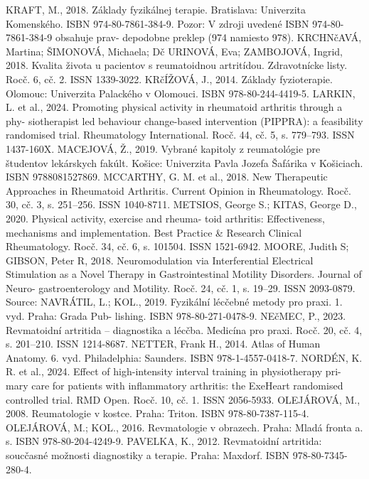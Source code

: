 KRAFT, M., 2018. Základy fyzikálnej terapie. Bratislava: Univerzita Komenského. ISBN
974-80-7861-384-9. Pozor: V zdroji uvedené ISBN 974-80-7861-384-9 obsahuje prav-
depodobne preklep (974 namiesto 978).
KRCHNčAVÁ, Martina; ŠIMONOVÁ, Michaela; Dč URINOVÁ, Eva; ZAMBOJOVÁ, Ingrid,
2018. Kvalita života u pacientov s reumatoidnou artritídou. Zdravotnícke listy. Rocč. 6, cč.
2. ISSN 1339-3022.
KRčÍŽOVÁ, J., 2014. Základy fyzioterapie. Olomouc: Univerzita Palackého v Olomouci.
ISBN 978-80-244-4419-5.
LARKIN, L. et al., 2024. Promoting physical activity in rheumatoid arthritis through a phy-
siotherapist led behaviour change-based intervention (PIPPRA): a feasibility randomised
trial. Rheumatology International. Rocč. 44, cč. 5, s. 779–793. ISSN 1437-160X.
MACEJOVÁ, Ž., 2019. Vybrané kapitoly z reumatológie pre študentov lekárskych fakúlt.
Košice: Univerzita Pavla Jozefa Šafárika v Košiciach. ISBN 9788081527869.
MCCARTHY, G. M. et al., 2018. New Therapeutic Approaches in Rheumatoid Arthritis.
Current Opinion in Rheumatology. Rocč. 30, cč. 3, s. 251–256. ISSN 1040-8711.
METSIOS, George S.; KITAS, George D., 2020. Physical activity, exercise and rheuma-
toid arthritis: Effectiveness, mechanisms and implementation. Best Practice & Research
Clinical Rheumatology. Rocč. 34, cč. 6, s. 101504. ISSN 1521-6942.
MOORE, Judith S; GIBSON, Peter R, 2018. Neuromodulation via Interferential Electrical
Stimulation as a Novel Therapy in Gastrointestinal Motility Disorders. Journal of Neuro-
gastroenterology and Motility. Rocč. 24, cč. 1, s. 19–29. ISSN 2093-0879. Source:
NAVRÁTIL, L.; KOL., 2019. Fyzikální lécčebné metody pro praxi. 1. vyd. Praha: Grada Pub-
lishing. ISBN 978-80-271-0478-9.
NEčMEC, P., 2023. Revmatoidní artritida – diagnostika a lécčba. Medicína pro praxi. Rocč. 20,
cč. 4, s. 201–210. ISSN 1214-8687.
NETTER, Frank H., 2014. Atlas of Human Anatomy. 6. vyd. Philadelphia: Saunders. ISBN
978-1-4557-0418-7.
NORDÉN, K. R. et al., 2024. Effect of high-intensity interval training in physiotherapy pri-
mary care for patients with inflammatory arthritis: the ExeHeart randomised controlled
trial. RMD Open. Rocč. 10, cč. 1. ISSN 2056-5933.
OLEJÁROVÁ, M., 2008. Reumatologie v kostce. Praha: Triton. ISBN 978-80-7387-115-4.
OLEJÁROVÁ, M.; KOL., 2016. Revmatologie v obrazech. Praha: Mladá fronta a. s. ISBN
978-80-204-4249-9.
PAVELKA, K., 2012. Revmatoidní artritida: soucčasné možnosti diagnostiky a terapie. Praha:
Maxdorf. ISBN 978-80-7345-280-4.


